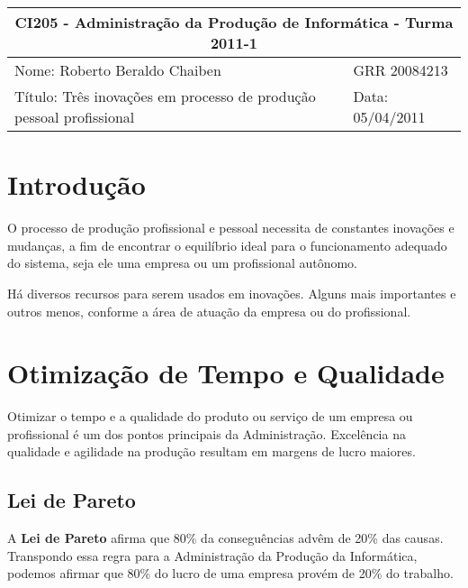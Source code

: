 \documentclass{article}
\title{}
\author{}
\begin{document}




\setlength{\parskip}{2ex}

\begin{tabular}[l]{ | p{10cm} | l | }
  \hline
  \multicolumn{2}{|c|}{CI205 - Administração da Produção de Informática - Turma 2011-1} \\
  \hline
  Nome: Roberto Beraldo Chaiben & 
  GRR 20084213 \\
  \hline
  Título: Três inovações em processo de produção pessoal profissional &
  Data: 05/04/2011 \\
  \hline
\end{tabular}


\vspace{2cm}


\section*{Introdução}

O processo de produção profissional e pessoal necessita de constantes inovações
e mudanças, a fim de encontrar o equilíbrio ideal para o funcionamento adequado
do sistema, seja ele uma empresa ou um profissional autônomo.

Há diversos recursos para serem usados em inovações. Alguns mais importantes e
outros menos, conforme a área de atuação da empresa ou do profissional.


\section{Otimização de Tempo e Qualidade}

Otimizar o tempo e a qualidade do produto ou serviço de um empresa ou profissional
é um dos pontos principais da Administração. Excelência na qualidade e agilidade
na produção resultam em margens de lucro maiores.

\subsection{Lei de Pareto}

A \textbf{Lei de Pareto} afirma que 80\% da conseguências advêm de 20\% das causas.
Transpondo essa regra para a Administração da Produção da Informática, podemos
afirmar que 80\% do lucro de uma empresa provém de 20\% do trabalho.
\end{document}
